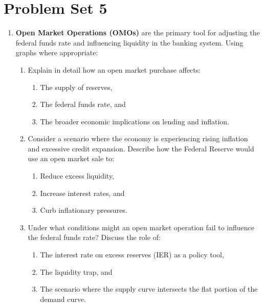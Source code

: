 \newpage

\section{Problem Set 5}



\begin{enumerate}

    \item \textbf{Open Market Operations (OMOs)} are the primary tool for adjusting the
    federal funds rate and influencing liquidity in the banking system. Using
    graphs where appropriate:
    
    \begin{enumerate}
        \item Explain in detail how an open market purchase affects:
        \begin{enumerate}
            \item The supply of reserves,
            \item The federal funds rate, and
            \item The broader economic implications on lending and inflation.
        \end{enumerate}

        \item Consider a scenario where the economy is experiencing rising inflation and
        excessive credit expansion. Describe how the Federal Reserve would use an
        open market sale to:
        \begin{enumerate}
            \item Reduce excess liquidity,
            \item Increase interest rates, and
            \item Curb inflationary pressures.
        \end{enumerate}


        \item Under what conditions might an open market operation fail to influence the
        federal funds rate? Discuss the role of:
        \begin{enumerate}
            \item The interest rate on excess reserves (IER) as a policy tool,
            \item The liquidity trap, and
            \item The scenario where the supply curve intersects the flat portion of
            the demand curve.
        \end{enumerate}
    \end{enumerate}


\end{enumerate}
